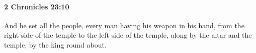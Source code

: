
		\paragraph{2 Chronicles 23:10} %
			\label{2CHRONICLES-23-10}

			And he set all the people, every man having his weapon in his hand, from the right side of the temple to the left side of the temple, along by the altar and the temple, by the king round about.


